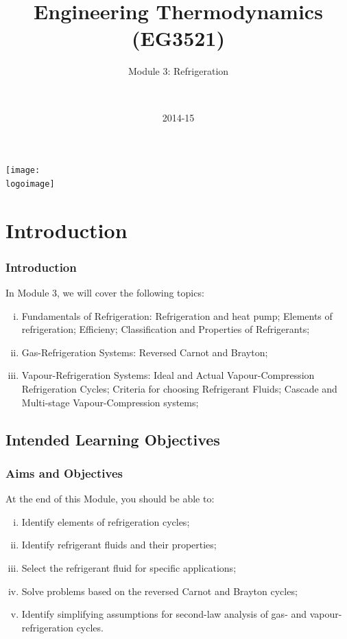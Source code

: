 \documentclass[10pt,compress]{beamer}
\institute{School of Engineering}
\title{Engineering Thermodynamics (EG3521)}
\subtitle{Module 3: Refrigeration}
\date[2014-15]{2014-15}
\author[\shortname]{%
  \fullname\\\ttfamily{\emailaddress}
}
\newcommand{\logoimage}{../FigBanner/UoAHorizBanner}
\begin{document}
\begin{frame}
  \titlepage
  \vfill%
  \begin{center}
    \texttt{[image: \\logoimage]}
  \end{center}
\end{frame}




\section{Introduction}

\begin{frame}
 \frametitle{Introduction}
  In Module 3, we will cover the following topics:
  \begin{enumerate}[(i)]
   \item <1-> Fundamentals of Refrigeration: Refrigeration and heat pump; Elements of refrigeration; Efficieny; Classification and Properties of Refrigerants;
   \item <2-> Gas-Refrigeration Systems: Reversed Carnot and Brayton;
   \item <3-> Vapour-Refrigeration Systems: Ideal and Actual Vapour-Compression Refrigeration Cycles; Criteria for choosing Refrigerant Fluids; Cascade and Multi-stage Vapour-Compression systems;
  \end{enumerate}
\end{frame}

\subsection{Intended Learning Objectives}
\begin{frame}
 \frametitle{Aims and Objectives}
  At the end of this Module, you should be able to:
  \begin{enumerate}[(i)]
   \item <1-> Identify elements of refrigeration cycles;
   \item <1-> Identify refrigerant fluids and their properties;
   \item <1-> Select the refrigerant fluid for specific applications;
   \item <1-> Solve problems based on the reversed Carnot and Brayton cycles;
   \item <1-> Identify simplifying assumptions for second-law analysis of gas- and vapour-refrigeration cycles.
  \end{enumerate}
\end{frame}
\end{document}
